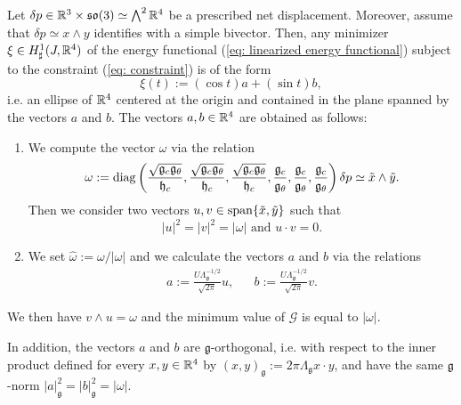 \begin{theorem}
\label{thm:optimal control curves in the simple case}
Let $\delta p \in \mathbb{R}^3 \times \mathfrak{so}(3) \simeq \bigwedge^2 \mathbb{R}^4$ be a prescribed net displacement. Moreover, assume that $\delta p \simeq x \wedge y$ identifies with a simple bivector. Then, any minimizer $\xi \in H_{\sharp}^1(J, \mathbb{R}^4)$ of the energy functional (\ref{eq: linearized energy functional}) subject to the constraint (\ref{eq: constraint}) is of the form
\begin{equation}
\xi(t) := (\cos t) a + (\sin t) b,
\end{equation}
i.e. an ellipse of $\mathbb{R}^4$ centered at the origin and contained in the plane spanned by the vectors $a$ and $b$. The vectors $a,b \in \mathbb{R}^4$ are obtained as follows:
\begin{enumerate}
\item We compute the vector $\omega$ via the relation
\begin{equation}
\omega := \operatorname{diag} \left (\frac{\sqrt{\mathfrak{g}_c \mathfrak{g}_{\theta}}}{\mathfrak{h}_c}, \frac{\sqrt{\mathfrak{g}_c \mathfrak{g}_{\theta}}}{\mathfrak{h}_c}, \frac{\sqrt{\mathfrak{g}_c \mathfrak{g}_{\theta}}}{\mathfrak{h}_c}, \frac{\mathfrak{g}_c}{\mathfrak{g}_\theta}, \frac{\mathfrak{g}_c}{\mathfrak{g}_\theta}, \frac{\mathfrak{g}_c}{\mathfrak{g}_\theta} \right ) \delta p \simeq \tilde{x} \wedge \tilde{y}.
\end{equation}
Then we consider two vectors $u,v \in \operatorname{span}\{\tilde{x}, \tilde{y}\}$ such that
\begin{equation}
\label{eq:global minimizer condition}
|u|^2 = |v|^2 = |\omega| \text{ and } u \cdot v = 0.
\end{equation}

\item We set $\hat{\omega} := \omega/|\omega|$ and we calculate the vectors $a$ and $b$ via the relations
\begin{equation}
\label{eq:global minimizer form}
\begin{aligned}
a := \frac{U \Lambda_{\mathfrak{g}}^{-1/2}}{\sqrt{2 \pi}} u,&& b := \frac{U \Lambda_{\mathfrak{g}}^{-1/2}}{\sqrt{2 \pi}} v.
\end{aligned}
\end{equation}
\end{enumerate}
We then have $ v \wedge u = \omega$ and the minimum value of $\mathcal{G}$ is equal to $|\omega|$.

In addition, the vectors $a$ and $b$ are $\mathfrak{g}$-orthogonal, i.e. with respect to the inner product defined for every $x,y \in \mathbb{R}^4$ by $(x, y)_{\mathfrak{g}} := 2 \pi \Lambda_{\mathfrak{g}} x \cdot y$, and have the same $\mathfrak{g}$-norm $|a|_{\mathfrak{g}}^2 = |b|_{\mathfrak{g}}^2 = |\omega|$. 
\end{theorem}

